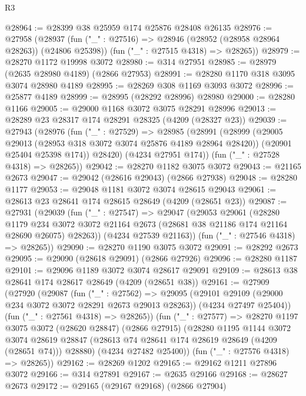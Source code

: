 \begin{lexlean}{R3}
\begin{coremodule}
@28964 := @28399 @38 @25959 @174 @25876 @28408 @26135
@28976 := @27958
    (@28937
      (fun ("_" : @27516) => @28946 (@28952 (@28958 @28964 @28263)) (@24806 @25398))
      (fun ("_" : @27515 @4318) => @28265))
@28979 := @28270 @1172 @19998 @3072
@28980 := @314 @27951
@28985 := @28979 (@2635 @28980 @4189) (@2866 @27953)
@28991 := @28280 @1170 @318 @3095 @3074 @28980 @4189
@28995 := @28269 @308 @1169 @3093 @3072
@28996 := @25877 @4189
@28999 := @28995 (@28292 @28996) @28980
@29000 := @28280 @1166
@29005 := @29000 @1168 @3072 @3075 @28291 @28996
@29013 := @28289 @23 @28317 @174 @28291 @28325 (@4209 (@28327 @23))
@29039 := @27943
    (@28976
      (fun ("_" : @27529) =>
      @28985
        (@28991
          (@28999
            (@29005 @29013 (@28953 @318 @3072 @3074 @25876 @4189 @28964 @28420))
            (@20901 @25404 @25398 @174))
          @28420)
        (@4234 @27951 @174))
      (fun ("_" : @27528 @4318) => @28265))
@29042 := @28270 @1182 @3075 @3072
@29043 := @21165 @2673
@29047 := @29042 (@28616 @29043) (@2866 @27938)
@29048 := @28280 @1177
@29053 := @29048 @1181 @3072 @3074 @28615 @29043
@29061 := @28613 @23 @28641 @174 @28615 @28649 (@4209 (@28651 @23))
@29087 := @27931
    (@29039
      (fun ("_" : @27547) =>
      @29047
        (@29053
          @29061
          (@28280
            @1179
            @234
            @3072
            @3072
            @21164
            @2673
            (@28681 @38 @21186 @174 @21164 @28690 @26075)
            @28263))
        (@4234 @27539 @21163))
      (fun ("_" : @27546 @4318) => @28265))
@29090 := @28270 @1190 @3075 @3072
@29091 := @28292 @2673
@29095 := @29090 (@28618 @29091) (@2866 @27926)
@29096 := @28280 @1187
@29101 := @29096 @1189 @3072 @3074 @28617 @29091
@29109 := @28613 @38 @28641 @174 @28617 @28649 (@4209 (@28651 @38))
@29161 := @27909
    (@27920
      (@29087
        (fun ("_" : @27562) =>
        @29095
          (@29101 @29109 (@29000 @234 @3072 @3072 @28291 @2673 @29013 @28263))
          (@4234 @27497 @25404))
        (fun ("_" : @27561 @4318) => @28265))
      (fun ("_" : @27577) =>
      @28270
        @1197
        @3075
        @3072
        (@28620 @28847)
        (@2866 @27915)
        (@28280
          @1195
          @1144
          @3072
          @3074
          @28619
          @28847
          (@28613 @74 @28641 @174 @28619 @28649 (@4209 (@28651 @74)))
          @28880)
        (@4234 @27482 @25400))
      (fun ("_" : @27576 @4318) => @28265))
@29162 := @28269 @1202
@29165 := @29162 @1211 @27896 @3072
@29166 := @314 @27891
@29167 := @2635 @29166
@29168 := @28627 @2673
@29172 := @29165 (@29167 @29168) (@2866 @27904)

\end{coremodule}
\end{lexlean}
